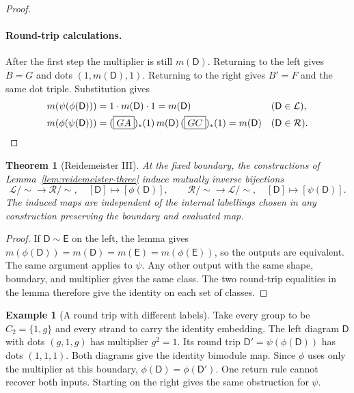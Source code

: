 \documentclass[11pt,a4paper]{article}
\numberwithin{equation}{section}
\newtheorem{theorem}{Theorem}[section]
\theoremstyle{definition}
\newtheorem{example}{Example}[section]
\begin{document}
\begin{proof}
\paragraph{Round-trip calculations.}
After the first step the multiplier is still \(m(\mathsf D)\).
Returning to the left gives \(B=G\) and dots
\((1,m(\mathsf D),1)\). Returning to the right gives \(B'=F\)
and the same dot triple. Substitution gives
\begin{equation*}
\begin{aligned}
 m(\psi(\phi(\mathsf D)))&=1\cdot m(\mathsf D)\cdot1
    =m(\mathsf D) &&(\mathsf D\in\mathcal L),\\
 m(\phi(\psi(\mathsf D)))&=(\boxed{GA})_*(1)\,m(\mathsf D)\,(\boxed{GC})_*(1)
    =m(\mathsf D) &&(\mathsf D\in\mathcal R).
\end{aligned}
\qedhere
\end{equation*}
\end{proof}

\begin{theorem}[Reidemeister III]\label{thm:reidemeister-three}
At the fixed boundary, the constructions of Lemma~\ref{lem:reidemeister-three}
induce mutually inverse bijections
\[
 \mathcal L/{\sim}\longrightarrow\mathcal R/{\sim},
 \quad [\mathsf D]\longmapsto[\phi(\mathsf D)],
 \qquad
 \mathcal R/{\sim}\longrightarrow\mathcal L/{\sim},
 \quad [\mathsf D]\longmapsto[\psi(\mathsf D)].
\]
The induced maps are independent of the internal labellings chosen
in any construction preserving the boundary and evaluated map.
\end{theorem}

\begin{proof}
If \(\mathsf D\sim\mathsf E\) on the left, the lemma gives
\(m(\phi(\mathsf D))=m(\mathsf D)=m(\mathsf E)=m(\phi(\mathsf E))\),
so the outputs are equivalent. The same argument applies to
\(\psi\). Any other output with the same shape, boundary, and
multiplier gives the same class. The two round-trip equalities
in the lemma therefore give the identity on each set of classes.
\end{proof}


\begin{example}[A round trip with different labels]\label{ex:induction-round-trip}
Take every group to be \(C_2=\{1,g\}\) and every strand to carry the
identity embedding. The left diagram \(\mathsf D\) with dots \((g,1,g)\)
has multiplier \(g^2=1\). Its round trip \(\mathsf D'=\psi(\phi(\mathsf D))\)
has dots \((1,1,1)\). Both diagrams give the identity bimodule map.
Since \(\phi\) uses only the multiplier at this boundary,
\(\phi(\mathsf D)=\phi(\mathsf D')\). One return rule cannot recover
both inputs. Starting on the right gives the same obstruction for \(\psi\).
\end{example}
\end{document}
